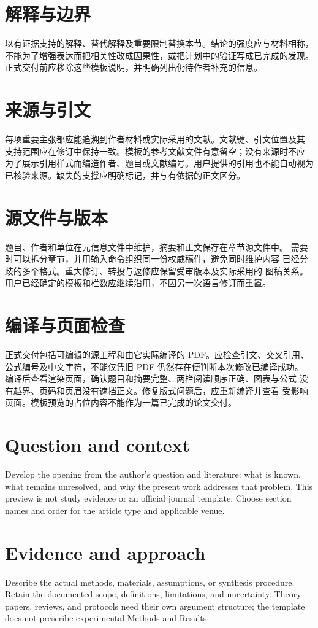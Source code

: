 \section{解释与边界}
以有证据支持的解释、替代解释及重要限制替换本节。结论的强度应与材料相称，
不能为了增强表达而把相关性改成因果性，或把计划中的验证写成已完成的发现。
正式交付前应移除这些模板说明，并明确列出仍待作者补充的信息。

\section{来源与引文}
每项重要主张都应能追溯到作者材料或实际采用的文献。文献键、引文位置及其
支持范围应在修订中保持一致。模板的参考文献文件有意留空；没有来源时不应
为了展示引用样式而编造作者、题目或文献编号。用户提供的引用也不能自动视为
已核验来源。缺失的支撑应明确标记，并与有依据的正文区分。

\section{源文件与版本}
题目、作者和单位在元信息文件中维护，摘要和正文保存在章节源文件中。
需要时可以拆分章节，并用输入命令组织同一份权威稿件，避免同时维护内容
已经分歧的多个格式。重大修订、转投与返修应保留受审版本及实际采用的
图稿关系。用户已经确定的模板和栏数应继续沿用，不因另一次语言修订而重置。

\section{编译与页面检查}
正式交付包括可编辑的源工程和由它实际编译的 PDF。应检查引文、交叉引用、
公式编号及中文字符，不能仅凭旧 PDF 仍然存在便判断本次修改已编译成功。
编译后查看渲染页面，确认题目和摘要完整、两栏阅读顺序正确、图表与公式
没有越界、页码和页眉没有遮挡正文。修复版式问题后，应重新编译并查看
受影响页面。模板预览的占位内容不能作为一篇已完成的论文交付。
\else
\section{Question and context}
Develop the opening from the author's question and literature: what is known,
what remains unresolved, and why the present work addresses that problem.
This preview is not study evidence or an official journal template. Choose
section names and order for the article type and applicable venue.

\section{Evidence and approach}
Describe the actual methods, materials, assumptions, or synthesis procedure.
Retain the documented scope, definitions, limitations, and uncertainty.
Theory papers, reviews, and protocols need their own argument structure;
the template does not prescribe experimental Methods and Results.

